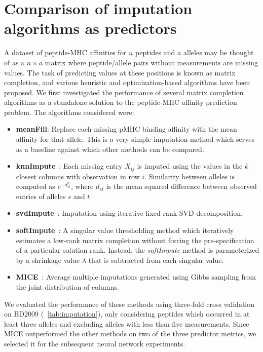 \section{Comparison of imputation algorithms as predictors}

A dataset of peptide-MHC affinities for $n$ peptides and $a$ alleles may be thought of as a $n \times a$ matrix where peptide/allele pairs without measurements are missing values. The task of predicting values at these positions is known as matrix completion, and various heuristic and optimization-based algorithms have been proposed. We first investigated the performance of several matrix completion algorithms as a standalone solution to the peptide-MHC affinity prediction problem. The algorithms considered were:

\begin{itemize}
\item {\bf meanFill}: Replace each missing pMHC binding affinity with the mean affinity for that allele. This is a very simple imputation method which serves as a baseline against which other methods can be compared. 

\item {\bf knnImpute}~\cite{Troyanskaya_2001}: Each missing entry $X_{ij}$ is imputed using the values in the $k$ closest columns with observation in row $i$.  Similarity between alleles is computed as $e^{-d_{st}^2}$, where $d_{st}$ is the mean squared difference between observed entries of alleles $s$ and $t$. 

\item {\bf svdImpute}~\cite{Troyanskaya_2001}: Imputation using iterative fixed rank SVD decomposition. 

\item {\bf softImpute}~\cite{Mazumder2010SpectralMatrices}: A singular value thresholding method which iteratively estimates a low-rank matrix completion without forcing the pre-specification of a particular solution rank. Instead, the {\it softImpute} method is parameterized by a shrinkage value $\lambda$ that is subtracted from each singular value. 

\item {\bf MICE}~\cite{Azur_2011}: Average multiple imputations generated using Gibbs sampling from the joint distribution of columns. 
\end{itemize}

We evaluated the performance of these methods using three-fold cross validation on BD2009 (~\ref{tab:imputation}), only considering peptides which occurred in at least three alleles and excluding alleles with less than five measurements. Since MICE outperformed the other methods on two of the three predictor metrics, we selected it for the subsequent neural network experiments.


